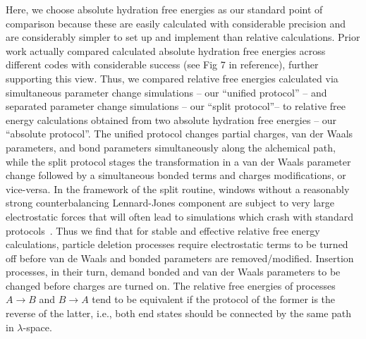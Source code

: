\documentclass[journal=jctcce,manuscript=article]{achemso}
\begin{document}
Here, we choose absolute hydration free energies as our standard point of comparison 
because these are easily calculated with considerable precision 
\cite{doi:10.1021/acs.jced.7b00104} %
and are considerably simpler to set up and implement than relative calculations.
Prior work actually compared calculated absolute hydration free energies across different codes with 
considerable success \cite{klimovich_predicting_2010} (see Fig 7 in reference), further supporting this view.
Thus, we compared relative free energies calculated via simultaneous parameter change simulations -- our ``unified protocol'' -- 
and separated parameter change simulations -- our ``split protocol''-- to relative free energy 
calculations obtained from two absolute hydration free energies -- our ``absolute protocol''.
The unified protocol changes partial charges, van der Waals parameters, and bond 
parameters simultaneously along the alchemical path, while the split protocol 
stages the transformation in a van der Waals parameter change followed by a simultaneous  
bonded terms and charges modifications, or vice-versa. In the framework 
of the split routine, windows without a reasonably strong counterbalancing Lennard-Jones 
component are subject to very large electrostatic forces that will often lead to simulations
which crash with standard protocols~\cite{pitera_comparison_2002, anwar_robust_2005}. %
Thus we find that for stable and effective relative free energy calculations, particle deletion processes
require electrostatic terms to be turned off before van de Waals and bonded parameters are removed/modified. 
Insertion processes, in their turn, demand bonded and van der Waals parameters to be changed before charges are turned on.
The relative free energies of processes $A \rightarrow B$ and $B \rightarrow A$ tend to be equivalent if the protocol of the former
is the reverse of the latter, i.e., both end states should be connected by the same path in $\lambda$-space. 
\end{document}
